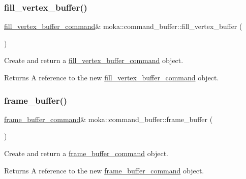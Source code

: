\subsubsection{\texorpdfstring{fill\_vertex\_buffer()}{fill\_vertex\_buffer()}}
{\footnotesize\ttfamily \mbox{\hyperlink{classmoka_1_1fill__vertex__buffer__command}{fill\+\_\+vertex\+\_\+buffer\+\_\+command}}\& moka\+::command\+\_\+buffer\+::fill\+\_\+vertex\+\_\+buffer (\begin{DoxyParamCaption}{ }\end{DoxyParamCaption})}



Create and return a \mbox{\hyperlink{classmoka_1_1fill__vertex__buffer__command}{fill\+\_\+vertex\+\_\+buffer\+\_\+command}} object. 

\begin{DoxyReturn}{Returns}
A reference to the new \mbox{\hyperlink{classmoka_1_1fill__vertex__buffer__command}{fill\+\_\+vertex\+\_\+buffer\+\_\+command}} object. 
\end{DoxyReturn}
\mbox{\label{classmoka_1_1command__buffer_a1424c63f7c6ed14cc9c7fe2b1a2b6400}} 
\subsubsection{\texorpdfstring{frame\_buffer()}{frame\_buffer()}}
{\footnotesize\ttfamily \mbox{\hyperlink{classmoka_1_1frame__buffer__command}{frame\+\_\+buffer\+\_\+command}}\& moka\+::command\+\_\+buffer\+::frame\+\_\+buffer (\begin{DoxyParamCaption}{ }\end{DoxyParamCaption})}



Create and return a \mbox{\hyperlink{classmoka_1_1frame__buffer__command}{frame\+\_\+buffer\+\_\+command}} object. 

\begin{DoxyReturn}{Returns}
A reference to the new \mbox{\hyperlink{classmoka_1_1frame__buffer__command}{frame\+\_\+buffer\+\_\+command}} object. 
\end{DoxyReturn}
\mbox{\label{classmoka_1_1command__buffer_ac440268877f7ed2297d2b7de4dac0e7a}} 
